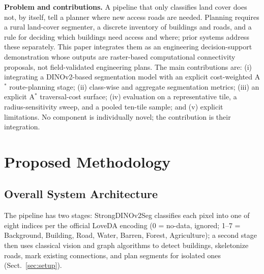\documentclass[runningheads]{llncs}
\begin{document}
\textbf{Problem and contributions.} A pipeline that only classifies land cover does not, by itself, tell a planner where new access roads are needed. Planning requires a rural land-cover segmenter, a discrete inventory of buildings and roads, and a rule for deciding which buildings need access and where; prior systems address these separately. This paper integrates them as an engineering decision-support demonstration whose outputs are raster-based computational connectivity proposals, not field-validated engineering plans. The main contributions are: (i) integrating a DINOv2-based segmentation model with an explicit cost-weighted A$^{*}$ route-planning stage; (ii) class-wise and aggregate segmentation metrics; (iii) an explicit A$^{*}$ traversal-cost surface; (iv) evaluation on a representative tile, a radius-sensitivity sweep, and a pooled ten-tile sample; and (v) explicit limitations. No component is individually novel; the contribution is their integration.

\section{Proposed Methodology}
\subsection{Overall System Architecture}
The pipeline has two stages: StrongDINOv2Seg classifies each pixel into one of eight indices per the official LoveDA encoding (0 = no-data, ignored; 1--7 = Background, Building, Road, Water, Barren, Forest, Agriculture); a second stage then uses classical vision and graph algorithms to detect buildings, skeletonize roads, mark existing connections, and plan segments for isolated ones (Sect.~\ref{sec:setup}).
\end{document}
